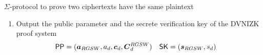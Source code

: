 \begin{section}{$\Sigma$-protocol to prove two ciphertexts have the same plaintext}
\begin{description}
\begin{enumerate}
\begin{enumerate}
        \item Sample polynomials $v,e' \sample \mathcal{D}_{R_q, \sigma_{BV}}$ and $e'' \sample  \mathcal{D}_{R_q, \sigma_{BV}'}$.
        \item Compute the following ciphertexts
          \begin{align*}
            \mat{C}_d^{RGSW} &= \vec{a}_{RGSW} \cdot \mat{R}_{RGSW} + \mat{E}_{RSGW} +  d \cdot \mat{G} &
            \vec{c}_d &= \begin{bmatrix} b_d v + 2e'' + \mu \\ a_d v + 2e' \end{bmatrix}
          \end{align*}
        \end{enumerate}
        \item Output the public parameter and the secrete verification key of the DVNIZK proof system
        \begin{align*}
          \PPP &= (\vec{a}_{RGSW}, a_d, \vec{c}_d, \vec{C}_d^{RGSW}) & \SK &= (\vec{s}_{RGSW}, s_d)
        \end{align*}
      \end{enumerate}




\end{description}
\end{section}
